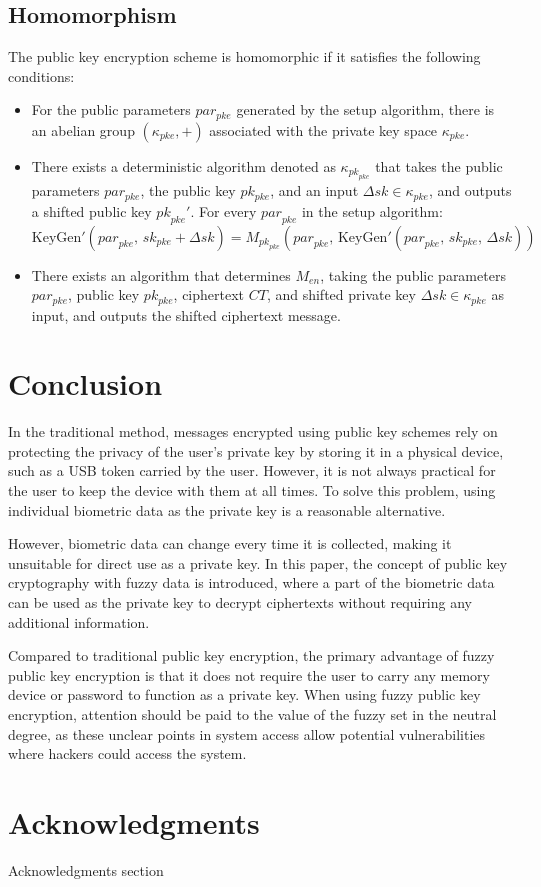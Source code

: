 \documentclass[graybox]{svmult}
\begin{document}
\subsection{Homomorphism}

The public key encryption scheme is homomorphic if it satisfies the following conditions:
\begin{itemize}
    \item For the public parameters \( par_{pke} \) generated by the setup algorithm, there is an abelian group \( (\kappa_{pke}, +) \) associated with the private key space \( \kappa_{pke} \).
    \item There exists a deterministic algorithm denoted as \( \kappa_{{pk}_{pke}} \) that takes the public parameters \( par_{pke} \), the public key \( pk_{pke} \), and an input \(\Delta{sk} \in \kappa_{pke} \), and outputs a shifted public key \({pk}_{pke}'\). For every \( {par}_{pke} \) in the setup algorithm:
          \[
              \text{KeyGen}'( {par}_{pke}, \, {sk}_{pke} + \Delta{sk}) = M_{{pk}_{pke}} ({par}_{pke}, \, \text{KeyGen}'({par}_{pke}, \, {sk}_{pke}, \, \Delta{sk}))
          \]

    \item There exists an algorithm that determines \( M_{en} \), taking the public parameters \( par_{pke} \), public key \( pk_{pke} \), ciphertext \( CT \), and shifted private key \( \Delta sk \in \kappa_{pke} \) as input, and outputs the shifted ciphertext message.
\end{itemize}

\section{Conclusion}
In the traditional method, messages encrypted using public key schemes rely on protecting the privacy of the user's private key by storing it in a physical device, such as a USB token carried by the user. However, it is not always practical for the user to keep the device with them at all times. To solve this problem, using individual biometric data as the private key is a reasonable alternative.

However, biometric data can change every time it is collected, making it unsuitable for direct use as a private key. In this paper, the concept of public key cryptography with fuzzy data is introduced, where a part of the biometric data can be used as the private key to decrypt ciphertexts without requiring any additional information.

Compared to traditional public key encryption, the primary advantage of fuzzy public key encryption is that it does not require the user to carry any memory device or password to function as a private key. When using fuzzy public key encryption, attention should be paid to the value of the fuzzy set in the neutral degree, as these unclear points in system access allow potential vulnerabilities where hackers could access the system.

\section*{Acknowledgments}
Acknowledgments section


\printbibliography
\end{document}
